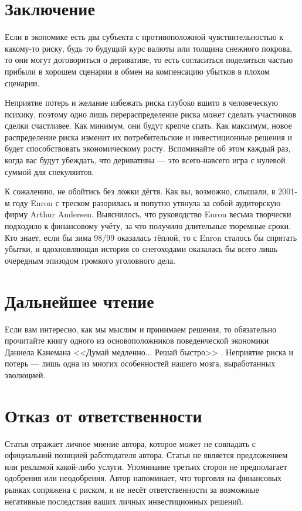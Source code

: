 \section*{Заключение}

Если в экономике есть два субъекта с противоположной чувствительностью
к какому-то риску, будь то будущий курс валюты или толщина снежного покрова, то они
могут договориться о деривативе, то есть согласиться поделиться частью прибыли
в хорошем сценарии в обмен на компенсацию убытков в плохом сценарии.

Неприятие потерь и желание избежать риска глубоко вшито в человеческую
психику, поэтому одно лишь перераспределение риска может сделать участников сделки
счастливее. Как минимум, они будут крепче спать. Как максимум, новое распределение
риска изменит их потребительские и инвестиционные решения и будет способствовать
экономическому росту. Вспоминайте об этом каждый раз, когда вас будут убеждать, что
деривативы --- это всего-навсего игра с нулевой суммой для спекулянтов.

К сожалению, не обойтись без ложки дёгтя. Как вы, возможно, слышали, в 2001-м году
Enron с треском разорилась и попутно утянула за собой аудиторскую фирму Arthur
Andersen. Выяснилось, что руководство Enron весьма творчески подходило к
финансовому учёту, за что получило длительные тюремные сроки. Кто знает, если бы
зима 98/99 оказалась тёплой, то с Enron сталось бы спрятать убытки, и вдохновляющая
история со снегоходами оказалась бы всего лишь очередным эпизодом громкого уголовного дела.

\section*{Дальнейшее чтение}

Если вам интересно, как мы мыслим и принимаем решения, то обязательно прочитайте
книгу одного из основоположников поведенческой экономики Даниела Канемана 
<<Думай медленно... Решай быстро>> \cite{kanheman2013think}. Неприятие риска и
потерь --- лишь одна из многих особенностей нашего мозга, выработанных эволюцией.

\section*{Отказ от ответственности}

Статья отражает личное мнение автора, которое может не совпадать с официальной 
позицией работодателя автора. Статья не является предложением или рекламой 
какой-либо услуги. Упоминание третьих сторон не предполагает одобрения или 
неодобрения. Автор напоминает, что торговля на финансовых рынках сопряжена 
с риском, и не несёт ответственности за возможные негативные последствия ваших 
личных инвестиционных решений.

\begin{otherlanguage}{english}
\printbibliography[title = \begin{otherlanguage}{russian}Список
литературы\end{otherlanguage}]
\end{otherlanguage}

\printendnotes


